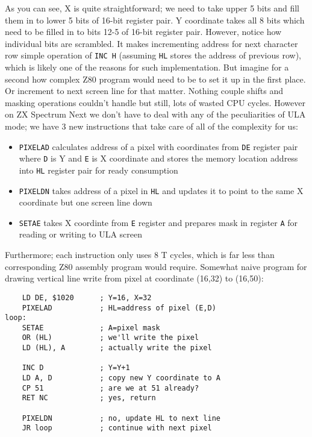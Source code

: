 \documentclass[12pt,twoside,openright,a4paper]{book}
\begin{document}
As you can see, X is quite straightforward; we need to take upper 5 bits and fill them in to lower 5 bits of 16-bit register pair. Y coordinate takes all 8 bits which need to be filled in to bits 12-5 of 16-bit register pair. However, notice how individual bits are scrambled. It makes incrementing address for next character row simple operation of {\tt INC H} (assuming {\tt HL} stores the address of previous row), which is likely one of the reasons for such implementation. But imagine for a second how complex Z80 program would need to be to set it up in the first place. Or increment to next screen line for that matter. Nothing couple shifts and masking operations couldn't handle but still, lots of wasted CPU cycles. However on ZX Spectrum Next we don't have to deal with any of the peculiarities of ULA mode; we have 3 new instructions that take care of all of the complexity for us:

\begin{itemize}[topsep=1pt,itemsep=1pt]
	\item {\tt PIXELAD} calculates address of a pixel with coordinates from {\tt DE} register pair where {\tt D} is Y and {\tt E} is X coordinate and stores the memory location address into {\tt HL} register pair for ready consumption
	
	\item {\tt PIXELDN} takes address of a pixel in {\tt HL} and updates it to point to the same X coordinate but one screen line down
	
	\item {\tt SETAE} takes X coordinte from {\tt E} register and prepares mask in register {\tt A} for reading or writing to ULA screen
\end{itemize}

Furthermore; each instruction only uses 8 T cycles, which is far less than corresponding Z80 assembly program would require. Somewhat naive program for drawing vertical line write from pixel at coordinate (16,32) to (16,50):

\pagebreak
\begin{Verbatim}
	LD DE, $1020      ; Y=16, X=32
	PIXELAD           ; HL=address of pixel (E,D)
loop:
	SETAE             ; A=pixel mask
	OR (HL)           ; we'll write the pixel
	LD (HL), A        ; actually write the pixel
	
	INC D             ; Y=Y+1
	LD A, D           ; copy new Y coordinate to A
	CP 51             ; are we at 51 already?
	RET NC            ; yes, return

	PIXELDN           ; no, update HL to next line
	JR loop           ; continue with next pixel
\end{Verbatim}
\end{document}
